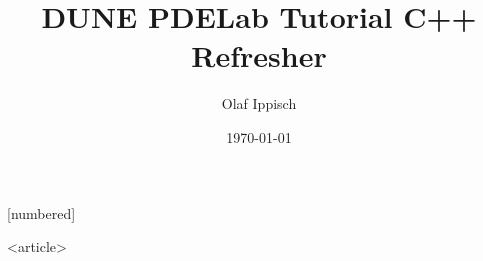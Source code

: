 \usepackage[english]{babel}
\usepackage[utf8]{inputenc}
\usepackage{lmodern}
\usepackage{amsmath,amssymb,amsfonts}


{
  [numbered]
  \usepackage{amscd}
}

\usepackage{multicol}
\usepackage{enumerate}
\usepackage{color}
\usepackage{stmaryrd}
\usepackage{lmodern}



\title{DUNE PDELab Tutorial C++ Refresher}
\author{Olaf Ippisch}
\date[\today]{\today}

{

\newsavebox{\logobox}

}

%
%



\begin{onlyenv}<article>
\maketitle
\end{onlyenv}

\frame{\titlepage}


